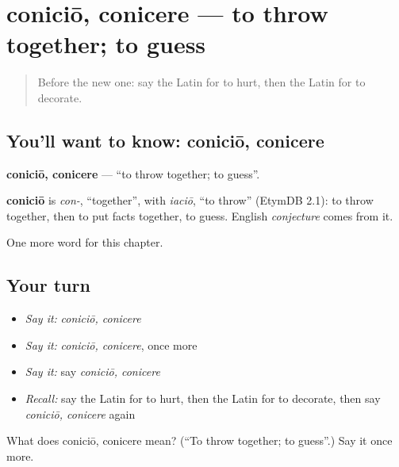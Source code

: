 \section[coniciō, conicere]{coniciō, conicere — to throw together; to guess}

\label{lesson:LA-C204-conicio}



\begin{quote}
Before the new one: say the Latin for to hurt, then the Latin for to decorate.
\end{quote}

\subsection*{You'll want to know: coniciō, conicere}
\textbf{coniciō, conicere} — \textquotedblleft{}to throw together; to guess\textquotedblright{}.

\begin{cousinweb}
\textbf{coniciō} is \emph{con-}, \textquotedblleft{}together\textquotedblright{}, with \emph{iaciō}, \textquotedblleft{}to throw\textquotedblright{} (EtymDB 2.1): to throw together, then to put facts together, to guess. English \emph{conjecture} comes from it.
\end{cousinweb}

\begin{grammarlens}[title={What you've built}]
One more word for this chapter.
\end{grammarlens}

\subsection*{Your turn}
\begin{itemize}
\raggedright
  \item \emph{Say it:} \emph{coniciō, conicere}
  \item \emph{Say it:} \emph{coniciō, conicere}, once more
  \item \emph{Say it:} say \emph{coniciō, conicere}
  \item \emph{Recall:} say the Latin for to hurt, then the Latin for to decorate, then say \emph{coniciō, conicere} again
\end{itemize}

\begin{tcolorbox}[breakable,colback=teal!4,colframe=teal!35!black,title={Before you move on}]
What does coniciō, conicere mean? (\textquotedblleft{}To throw together; to guess\textquotedblright{}.) Say it once more.
\end{tcolorbox}
